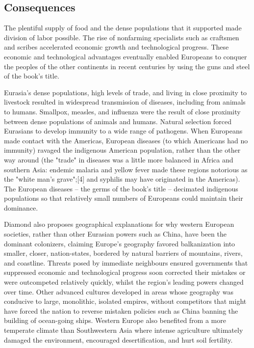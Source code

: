 \subsection{Consequences}

The plentiful supply of food and the dense populations that it supported made division of labor possible. The rise of nonfarming specialists such as craftsmen and scribes accelerated economic growth and technological progress. These economic and technological advantages eventually enabled Europeans to conquer the peoples of the other continents in recent centuries by using the guns and steel of the book's title.

Eurasia's dense populations, high levels of trade, and living in close proximity to livestock resulted in widespread transmission of diseases, including from animals to humans. Smallpox, measles, and influenza were the result of close proximity between dense populations of animals and humans. Natural selection forced Eurasians to develop immunity to a wide range of pathogens. When Europeans made contact with the Americas, European diseases (to which Americans had no immunity) ravaged the indigenous American population, rather than the other way around (the "trade" in diseases was a little more balanced in Africa and southern Asia: endemic malaria and yellow fever made these regions notorious as the "white man's grave";[4] and syphilis may have originated in the Americas). The European diseases – the germs of the book's title – decimated indigenous populations so that relatively small numbers of Europeans could maintain their dominance.

Diamond also proposes geographical explanations for why western European societies, rather than other Eurasian powers such as China, have been the dominant colonizers, claiming Europe's geography favored balkanization into smaller, closer, nation-states, bordered by natural barriers of mountains, rivers, and coastline. Threats posed by immediate neighbours ensured governments that suppressed economic and technological progress soon corrected their mistakes or were outcompeted relatively quickly, whilst the region's leading powers changed over time. Other advanced cultures developed in areas whose geography was conducive to large, monolithic, isolated empires, without competitors that might have forced the nation to reverse mistaken policies such as China banning the building of ocean-going ships. Western Europe also benefited from a more temperate climate than Southwestern Asia where intense agriculture ultimately damaged the environment, encouraged desertification, and hurt soil fertility.